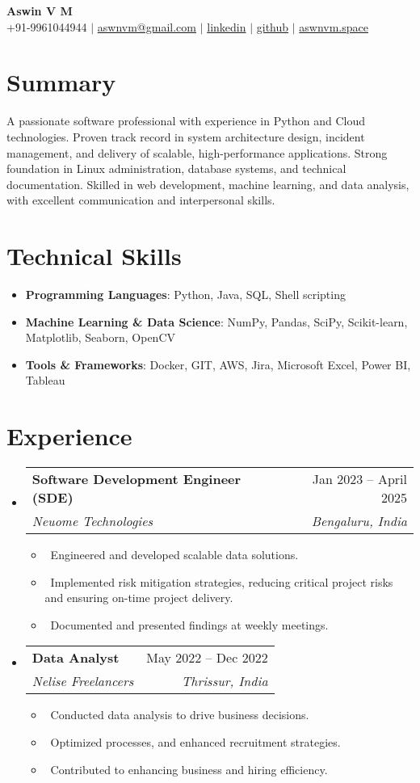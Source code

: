 \documentclass[letterpaper,10pt]{article}
\makeatletter
\newcommand{\resumeItem}[1]{\item\small{#1}}
\newcommand{\resumeSubheading}[4]{
\vspace{-1pt}\item
  \begin{tabular*}{0.97\textwidth}[t]{l@{\extracolsep{\fill}}r}
    \textbf{#1} & #2 \\
    \textit{#3} & \textit{#4} \\
  \end{tabular*}\vspace{-7pt}
}
\newcommand{\resumeSubHeadingList}{\begin{itemize}[leftmargin=0.15in, label={}]}
\newcommand{\resumeSubHeadingListEnd}{\end{itemize}}
\makeatother
\begin{document}
\begin{center}
  \textbf{\Huge Aswin V M} \\
  \small +91-9961044944 $|$ \href{mailto:aswnvm@gmail.com}{aswnvm@gmail.com} $|$
  \href{https://linkedin.com/in/aswin-vm}{linkedin} $|$
  \href{https://github.com/aswnvm}{github} $|$
  \href{https://aswnvm.space}{aswnvm.space}
\end{center}

\section*{Summary}
A passionate software professional with experience in Python and Cloud technologies. Proven track record in system architecture design, incident management, and delivery of scalable, high-performance applications. Strong foundation in Linux administration, database systems, and technical documentation. Skilled in web development, machine learning, and data analysis, with excellent communication and interpersonal skills.

\section{Technical Skills}
\resumeSubHeadingList
\resumeItem{\textbf{Programming Languages}: Python, Java, SQL, Shell scripting}
\resumeItem{\textbf{Machine Learning \& Data Science}: NumPy, Pandas, SciPy, Scikit-learn, Matplotlib, Seaborn, OpenCV}

\resumeItem{\textbf{Tools \& Frameworks}: Docker, GIT, AWS, Jira, Microsoft Excel, Power BI, Tableau}
\resumeSubHeadingListEnd

\section{Experience}
\resumeSubHeadingList
\resumeSubheading
{Software Development Engineer (SDE)}{Jan 2023 -- April 2025}
{Neuome Technologies}{Bengaluru, India}
\resumeSubHeadingList
\resumeItem{\textbullet\ Engineered and developed scalable data solutions.}
\resumeItem{\textbullet\	Implemented risk mitigation strategies, reducing critical project risks and ensuring on-time project delivery.}
\resumeItem{\textbullet\ Documented and presented findings at weekly meetings.}
\resumeSubHeadingListEnd
\resumeSubheading
{Data Analyst}{May 2022 -- Dec 2022}
{Nelise Freelancers}{Thrissur, India}
\resumeSubHeadingList
\resumeItem{\textbullet\ Conducted data analysis to drive business decisions.}
\resumeItem{\textbullet\ Optimized processes, and enhanced recruitment strategies.}
\resumeItem{ \textbullet\ Contributed to enhancing business and hiring efficiency.}
\resumeSubHeadingListEnd
\resumeSubHeadingListEnd
\end{document}
